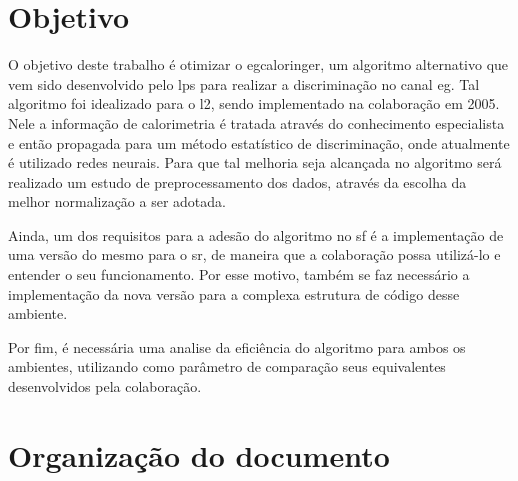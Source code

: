 \section{Objetivo} %

O objetivo deste trabalho é otimizar o \gls{egcaloringer},
um algoritmo alternativo que vem sido desenvolvido pelo \gls{lps}
para realizar a discriminação 
no canal \acrshort{eg}. Tal algoritmo foi idealizado para o \gls{l2}, 
sendo implementado na colaboração em 2005.
Nele a informação de calorimetria é tratada através do conhecimento especialista
e então propagada para um método estatístico 
de discriminação, onde atualmente é utilizado redes neurais. 
Para que tal melhoria seja alcançada no
algoritmo será realizado um estudo de preprocessamento dos dados,
através da escolha da melhor normalização a ser adotada.

Ainda, um dos requisitos para a adesão do algoritmo no \glsdesc{sf} é a
implementação de uma versão do mesmo para o \glsdesc{sr},
de maneira  que a colaboração possa utilizá-lo e entender o seu
funcionamento. Por esse motivo, também se faz necessário a implementação 
da nova versão para a complexa estrutura de código desse ambiente.

Por fim, é necessária uma analise da eficiência do algoritmo para ambos os
ambientes, utilizando como parâmetro de comparação seus equivalentes 
desenvolvidos pela colaboração.

\section{Organização do documento} {{{


}}}
